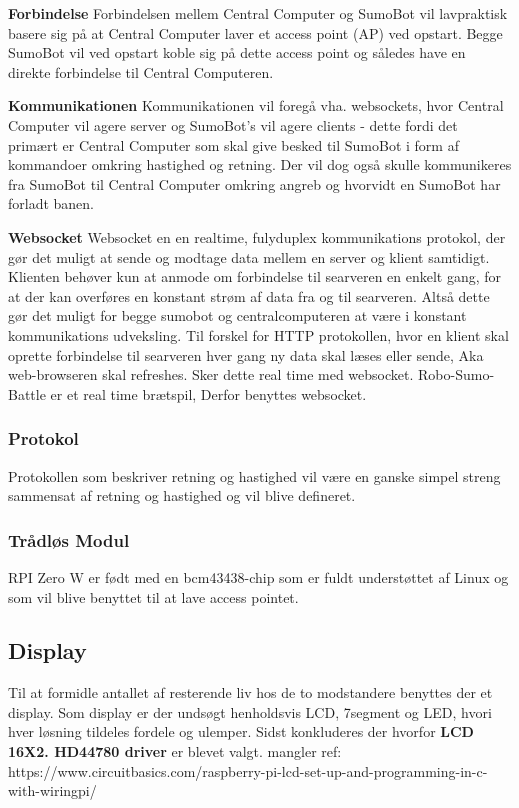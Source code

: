 \textbf{Forbindelse}\newline
Forbindelsen mellem Central Computer og SumoBot vil lavpraktisk basere sig på at Central Computer laver et access point (AP) ved opstart. Begge SumoBot vil ved opstart koble sig på dette access point og således have en direkte forbindelse til Central Computeren. 

\textbf{Kommunikationen}\newline
Kommunikationen vil foregå vha. websockets, hvor Central Computer vil agere server og SumoBot's vil agere clients - dette fordi det primært er Central Computer som skal give besked til SumoBot i form af kommandoer omkring hastighed og retning. Der vil dog også skulle kommunikeres fra SumoBot til Central Computer omkring angreb og hvorvidt en SumoBot har forladt banen. 

\textbf{Websocket}\newline
Websocket en en realtime, fulyduplex kommunikations protokol, der gør det muligt at sende og modtage data mellem en server og klient samtidigt. Klienten behøver kun at anmode om forbindelse til searveren en enkelt gang, for at der kan overføres en konstant strøm af data fra og til searveren. Altså dette gør det muligt for begge sumobot og centralcomputeren at være i konstant kommunikations udveksling. Til forskel for HTTP protokollen, hvor en klient skal oprette forbindelse til searveren hver gang ny data skal læses eller sende, Aka web-browseren skal refreshes. Sker dette real time med websocket. Robo-Sumo-Battle er et real time brætspil, Derfor benyttes websocket.

\subsubsection{Protokol}
Protokollen som beskriver retning og hastighed vil være en ganske simpel streng sammensat af retning og hastighed og vil blive defineret. 

\subsubsection{Trådløs Modul}
RPI Zero W er født med en bcm43438-chip som er fuldt understøttet af Linux og som vil blive benyttet til at lave access pointet. 

\subsection{Display}
Til at formidle antallet af resterende liv hos de to modstandere benyttes der et display. Som display er der undsøgt henholdsvis LCD, 7segment og LED, hvori hver løsning tildeles fordele og ulemper. Sidst konkluderes der hvorfor \textbf{LCD 16X2. HD44780 driver} er blevet valgt.
\newline
mangler ref:\\
https://www.circuitbasics.com/raspberry-pi-lcd-set-up-and-programming-in-c-with-wiringpi/\\


